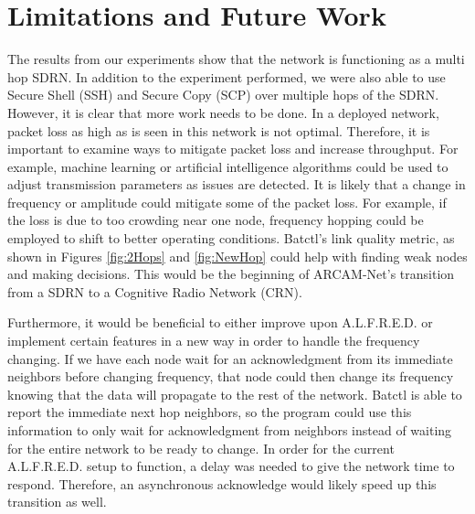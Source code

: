 \section{Limitations and Future Work}

The results from our experiments show that the network is functioning as a multi hop SDRN. In addition to the experiment performed, we were also able to use Secure Shell (SSH) and Secure Copy (SCP) over multiple hops of the SDRN. However, it is clear that more work needs to be done. In a deployed network, packet loss as high as is seen in this network is not optimal. Therefore, it is important to examine ways to mitigate packet loss and increase throughput. For example, machine learning or artificial intelligence algorithms could be used to adjust transmission parameters as issues are detected. It is likely that a change in frequency or amplitude could mitigate some of the packet loss. For example, if the loss is due to too crowding near one node, frequency hopping could be employed to shift to better operating conditions. Batctl's link quality metric, as shown in Figures \ref{fig:2Hops} and \ref{fig:NewHop} could help with finding weak nodes and making decisions. This would be the beginning of ARCAM-Net's transition from a SDRN to a Cognitive Radio Network (CRN). 

Furthermore, it would be beneficial to either improve upon A.L.F.R.E.D. or implement certain features in a new way in order to handle the frequency changing. If we have each node wait for an acknowledgment from its immediate neighbors before changing frequency, that node could then change its frequency knowing that the data will propagate to the rest of the network. Batctl is able to report the immediate next hop neighbors, so the program could use this information to only wait for acknowledgment from neighbors instead of waiting for the entire network to be ready to change. In order for the current A.L.F.R.E.D. setup to function, a delay was needed to give the network time to respond. Therefore, an asynchronous acknowledge would likely speed up this transition as well. 

